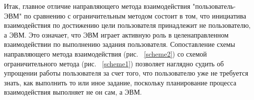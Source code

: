 	Итак, главное отличие направляющего метода взаимодействия "пользователь-ЭВМ" по сравнению с ограничительным методом состоит в том, что инициатива взаимодействия по достижению цели пользователя принадлежит не пользователю, а ЭВМ. Это означает, что ЭВМ играет активную роль в целенаправленном взаимодействии по выполнению задания пользователя. Сопоставление схемы направляющего метода взаимодействия (рис. ~\ref{scheme2}) со схемой ограничительного метода (рис. ~\ref{scheme1}) позволяет наглядно судить об упрощении работы пользователя за счет того, что пользователю уже не требуется знать, как выполнить то или иное задание, поскольку планирование процесса взаимодействия выполняет не он сам, а ЭВМ.
\noteattributes{}

